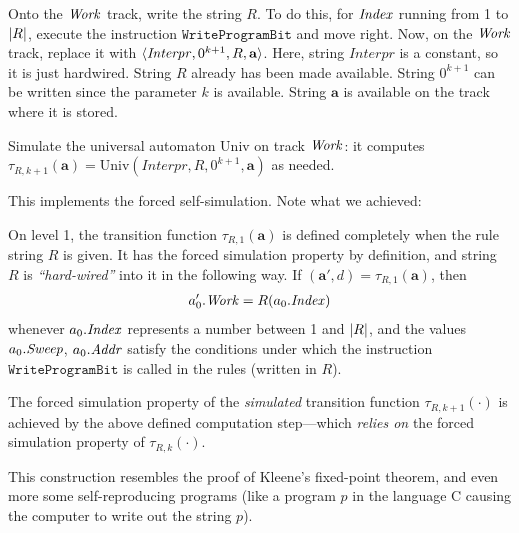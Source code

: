 \documentclass[11pt]{memoir}
\theoremstyle{definition} %
\renewcommand{\vek}[1]{\mathbf{#1}}
\newcommand{\fld}[1]{\ensuremath{\textit{#1\/}}}
\newcommand{\rul}[1]{\ensuremath{\texttt{#1}}}
\newcommand{\va}{\vek{a}}
\newcommand{\Addr}{\fld{Addr}}
\newcommand{\Index}{\fld{Index}}
\newcommand{\Sweep}{\fld{Sweep}}
\newcommand{\Work}{\fld{Work}}
\newcommand{\Interpr}{\mathit{Interpr}}
\newcommand{\Un}{\mathrm{Univ}}
\newcommand{\WriteProgramBit}{\rul{WriteProgramBit}}
\begin{document}
\begin{enumerate}
\item Onto the \( \Work \) track, write the string \( R \).
To do this, for \( \Index \) running from 1 to \( \lvert R \rvert \), 
execute the instruction \( \WriteProgramBit \) and move right.
Now, on the \( \Work  \) track, replace it with \( \ang{\Interpr,0^{k+1},R,\va} \).
Here, string \( \Interpr \) is a constant, so it is just hardwired.
String \( R \) already has been made available.
String \( 0^{k+1} \) can be written since the parameter \( k \) is available.
String \( \va \) is available on the track where it is stored.
\begin{sloppypar}
 \item Simulate the universal automaton \( \Un \) on track \( \Work \):
   it computes \( \tau_{R,k+1}(\va)=\Un(\Interpr,R,0^{k+1}, \va) \)
as needed.  
\end{sloppypar}
\end{enumerate}

This implements the forced self-simulation.
Note what we achieved:

\begin{itemize}
  \begin{sloppypar}
\item On level 1, the transition function \( \tau_{R,1}(\va) \) is defined completely
when the rule string \( R \) is given.
It has the forced simulation property by definition, and
string \( R \) is \emph{``hard-wired''} into it in the following way.
If \( (\va',d)=\tau_{R,1}(\va) \), then
\begin{align*}
  a'_{0}.\Work=R(a_{0}.\Index)
\end{align*}
whenever \( a_{0}.\Index \) represents a number between 1 and \( \lvert R \rvert \),
and the values \( a_{0}.\Sweep \), \( a_{0}.\Addr \) satisfy the conditions
under which the instruction \( \WriteProgramBit \) is 
called in the rules (written in \( R \)).
      \end{sloppypar}

      \begin{sloppypar}
\item The forced simulation property of the \emph{simulated}
transition function \( \tau_{R,k+1}(\cdot) \) is 
achieved by the above defined computation 
step---which \emph{relies on} the forced simulation property of \( \tau_{R,k}(\cdot) \).
              \end{sloppypar}
\end{itemize}

\begin{remark}
  This construction resembles the proof of Kleene's fixed-point theorem, and even more
  some self-reproducing programs (like a program \( p \) in the language C causing the computer
  to write out the string \( p \)).
\end{remark}
\end{document}
